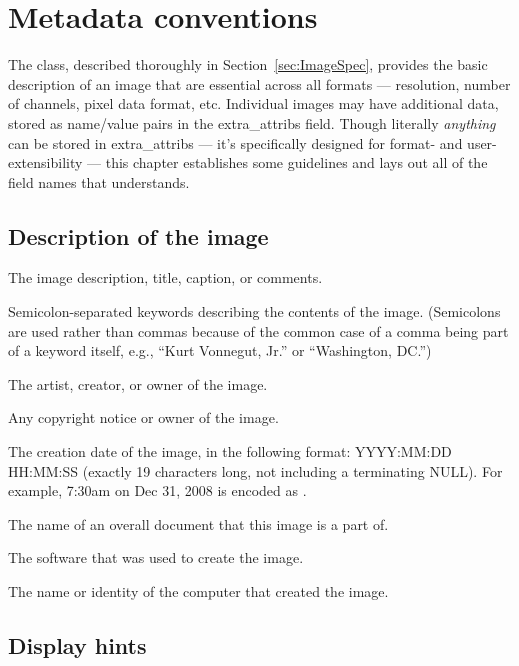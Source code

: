 \chapter{Metadata conventions}
\label{chap:stdmetadata}


The \ImageSpec class, described thoroughly in
Section~\ref{sec:ImageSpec}, provides the basic description of an image
that are essential across all formats --- resolution, number of
channels, pixel data format, etc.  Individual images may have additional
data, stored as name/value pairs in the {\cf extra_attribs} field.
Though literally \emph{anything} can be stored in {\cf extra_attribs}
--- it's specifically designed for format- and user-extensibility ---
this chapter establishes some guidelines and lays out all of the field
names that \product understands.


\section{Description of the image}

The image description, title, caption, or comments.
\apiend


Semicolon-separated keywords describing the contents of the image.
(Semicolons are used rather than commas because of the common case
of a comma being part of a keyword itself, e.g., ``Kurt Vonnegut, Jr.''
or ``Washington, DC.'')
\apiend

The artist, creator, or owner of the image.
\apiend

Any copyright notice or owner of the image.
\apiend

The creation date of the image, in the following format: {\cf YYYY:MM:DD
  HH:MM:SS} (exactly 19 characters long, not including a terminating
NULL).  For example, 7:30am on Dec
31, 2008 is encoded as .
\apiend

The name of an overall document that this image is a part of.
\apiend

The software that was used to create the image.
\apiend

The name or identity of the computer that created the image.
\apiend

\section{Display hints}
\label{metadata:displayhints}


